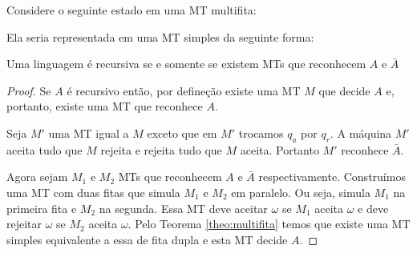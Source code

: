 \begin{example}
  Considere o seguinte estado em uma MT multifita: 
  \begin{center}
  \end{center}

  Ela seria representada em uma MT simples da seguinte forma:

  \begin{center}
  \end{center}
  
\end{example}

\begin{theorem}
  Uma linguagem é recursiva se e somente se existem MTs que reconhecem $A$ e $\bar{A}$
\end{theorem}
\begin{proof}
  Se $A$ é recursivo então, por defineção existe uma MT $M$ que decide $A$ e, portanto, existe uma MT que reconhece $A$.

  Seja $M'$ uma MT igual a $M$ exceto que em $M'$ trocamos $q_a$ por $q_r$.
  A máquina $M'$ aceita tudo que $M$ rejeita e rejeita tudo que $M$ aceita.
  Portanto $M'$ reconhece $\bar{A}$.

  Agora sejam $M_1$ e $M_2$ MTs que reconhecem $A$ e $\bar{A}$ respectivamente.
  Construímos uma MT com duas fitas que simula $M_1$ e $M_2$ em paralelo.
  Ou seja, simula $M_1$ na primeira fita e $M_2$ na segunda.
  Essa MT deve aceitar $\omega$ se $M_1$ aceita $\omega$ e deve rejeitar $\omega$ se $M_2$ aceita $\omega$.
  Pelo Teorema \ref{theo:multifita} temos que existe uma MT simples equivalente a essa de fita dupla e esta MT decide $A$.
\end{proof}

